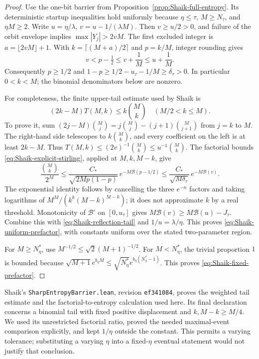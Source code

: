 \begin{proof}
Use the one-bit barrier from Proposition~\ref{prop:Shaik-full-entropy}.
Its deterministic startup inequalities hold uniformly because
\(\eta\le\tau\), \(M\ge N_\tau\), and \(\eta M\ge2\).
Write \(u=\eta/\lambda\), \(v=u-1/(\lambda M)\).
Then \(v\ge u/2>0\), and failure of the orbit envelope implies
\(\max|Y_j|>2vM\). The first excluded integer is
\(a=\lfloor2vM\rfloor+1\). With
\(k=\lceil(M+a)/2\rceil\) and \(p=k/M\), integer rounding gives
\[
 v<p-\tfrac12\le v+\frac1M\le u+\frac1M .
\]
Consequently \(p\ge1/2\) and
\(1-p\ge1/2-u_\tau-1/M\ge\delta_\tau>0\).
In particular \(0<k<M\); the binomial denominators below are nonzero.

For completeness, the finite upper-tail estimate used by Shaik is
\[
 (2k-M)T(M,k)\le k\binom Mk \quad(M/2<k\le M).
\]
To prove it, sum
\((2j-M)\binom Mj=j\binom Mj-(j+1)\binom M{j+1}\)
from \(j=k\) to \(M\). The right-hand side telescopes to
\(k\binom Mk\), and every coefficient on the left is at least \(2k-M\).
Thus \(T(M,k)\le(2v)^{-1}\binom Mk\le u^{-1}\binom Mk\).
The factorial bounds \eqref{eq:Shaik-explicit-stirling}, applied at
\(M,k,M-k\), give
\[
 \frac{\binom Mk}{2^M}
 \le \frac{C_*}{\sqrt{2Mp(1-p)}}\,
       e^{-M\mathcal B(p-1/2)}
 \le \frac{C_*}{\sqrt{M\delta_\tau}}\,
       e^{-M\mathcal B(v)} .
\]
The exponential identity follows by cancelling the three \(e^{-n}\)
factors and taking logarithms of \(M^M/(k^k(M-k)^{M-k})\);
it does not approximate \(k\) by a real threshold.
Monotonicity of \(\mathcal B'\) on \([0,u_\tau]\) gives
\(M\mathcal B(v)\ge M\mathcal B(u)-J_\tau\).
Combine this with \eqref{eq:Shaik-reflection-tail} and \(1/u=\lambda/\eta\).
This proves \eqref{eq:Shaik-uniform-prefactor}, with constants uniform
over the stated two-parameter region.

For \(M\ge N_\eta^*\), use
\(M^{-1/2}\le\sqrt2(M+1)^{-1/2}\).
For \(M<N_\eta^*\), the trivial proportion \(1\) is bounded because
\(\sqrt{M+1}e^{b_\eta M}\le
\sqrt{N_\eta^*}e^{b_\eta(N_\eta^*-1)}\).
This proves \eqref{eq:Shaik-fixed-prefactor}.
\end{proof}

Shaik's \texttt{SharpEntropyBarrier.lean}, revision
\texttt{ef341084}, proves the weighted tail estimate and the
factorial-to-entropy calculation used here. Its final declaration
concerns a binomial tail with fixed positive displacement and
\(k,M-k\ge M/4\). We used its unrestricted factorial ratio, proved
the needed maximal-event comparison explicitly, and kept
\(1/\eta\) outside the constant. This permits a varying tolerance;
substituting a varying \(\eta\) into a fixed-\(\eta\) eventual statement
would not justify that conclusion.

